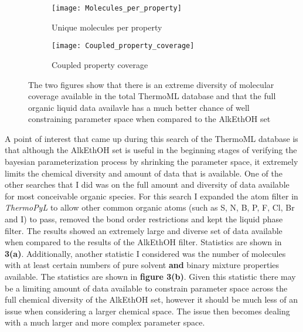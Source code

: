 \documentclass[rmp,nofootinbib,superscriptaddress,12pt,tightenlines,notitlepage]{revtex4-1}
\begin{document}
\begin{figure}[h!]
\centering
\begin{subfigure}{.5\textwidth}
  \centering
  \texttt{[image: Molecules\_per\_property]}
  \caption{Unique molecules per property}
  \label{fig:sub1}
\end{subfigure}%
\begin{subfigure}{.5\textwidth}
  \centering
  \texttt{[image: Coupled\_property\_coverage]}
  \caption{Coupled property coverage}
  \label{fig:sub2}
\end{subfigure}
\caption{The two figures show that there is an extreme diversity of molecular coverage available in the total ThermoML database and that the full organic liquid data availavle has a much better chance of well constraining parameter space when compared to the AlkEthOH set}
\label{fig:test}
\end{figure}
A point of interest that came up during this search of the ThermoML database is that although the AlkEthOH set is useful in the beginning stages
of verifying the bayesian parameterization process by shrinking the parameter space, it extremely limits the chemical diversity and amount of 
data that is available. One of the other searches that I did was on the full amount and diversity of data available for most conceivable organic
species. For this search I expanded the atom filter in \textit{ThermoPyL} to allow other common organic atoms (such as S, N, B, P, F, Cl, Br and I) to
pass, removed the bond order restrictions and kept the liquid phase filter. The results showed an extremely large and diverse set of data available when
compared to the results of the AlkEthOH filter. Statistics are shown in \textbf{3(a)}. Additionally, another statistic I considered was the number 
of molecules with at least certain numbers of pure solvent \textbf{and} binary mixture properties available. The statistics are shown in \textbf{figure 3(b)}. 
Given this statistic there may be a limiting amount of data available to constrain parameter space across the full chemical diversity of the AlkEthOH set, 
however it should be much less of an issue when considering a larger chemical space. The issue then becomes dealing with a much larger and more 
complex parameter space.
\end{document}
